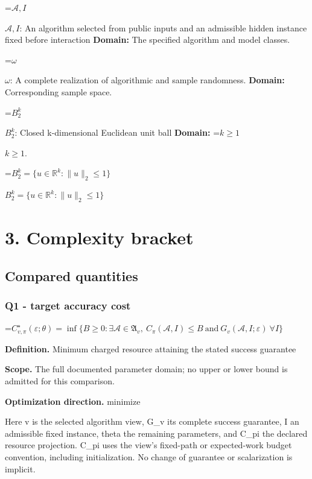 \documentclass[10pt,a4paper]{article}
\newcommand{\AtlasMath}[1]{\par\begingroup\centering\setbox0=\hbox{$\displaystyle #1$}\ifdim\wd0>1.4\linewidth\typeout{ATLAS WIDE FORMULA: \the\wd0}\fi\ifdim\wd0>\linewidth\resizebox{\linewidth}{!}{\box0}\else\box0\fi\par\endgroup}
\newcommand{\AtlasInlineMath}[1]{\begingroup\setbox0=\hbox{$#1$}\ifdim\wd0>.4\linewidth\endgroup\AtlasMath{#1}\else\endgroup$#1$\fi}
\begin{document}
\AtlasInlineMath{\mathcal A,I}: An algorithm selected from public inputs and an admissible hidden instance fixed before interaction \textbf{Domain:} The specified algorithm and model classes.



\AtlasInlineMath{\omega}: A complete realization of algorithmic and sample randomness. \textbf{Domain:} Corresponding sample space.



\AtlasInlineMath{B_2^k}: Closed k-dimensional Euclidean unit ball \textbf{Domain:} \AtlasInlineMath{k\ge1}.



\AtlasInlineMath{B_2^k=\{u\in\mathbb R^k:\|u\|_2\le1\}}



\section{3. Complexity bracket}


\subsection{Compared quantities}


\subsubsection{Q1 - target accuracy cost}


\AtlasMath{C^\star_{v,\pi}(\varepsilon;\theta)=\inf\{B\ge0:\exists\mathcal A\in\mathfrak A_v,\ C_\pi(\mathcal A,I)\le B\ \text{and}\ G_v(\mathcal A,I;\varepsilon)\ \forall I\}}


\textbf{Definition.} Minimum charged resource attaining the stated success guarantee



\textbf{Scope.} The full documented parameter domain; no upper or lower bound is admitted for this comparison.



\textbf{Optimization direction.} minimize



Here v is the selected algorithm view, G\_v its complete success guarantee, I an admissible fixed instance, theta the remaining parameters, and C\_pi the declared resource projection. C\_pi uses the view's fixed-path or expected-work budget convention, including initialization. No change of guarantee or scalarization is implicit.
\end{document}
